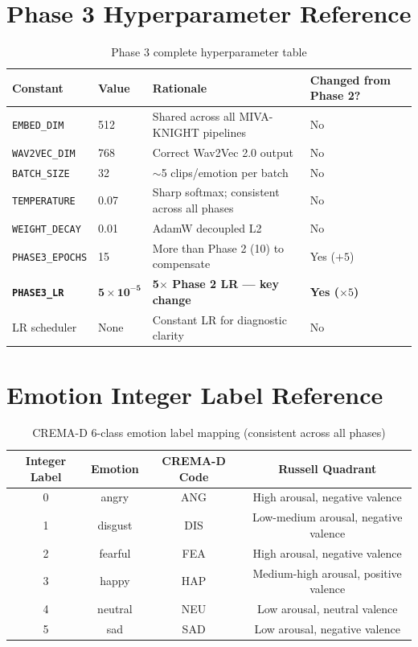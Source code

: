 \documentclass[12pt,a4paper]{article}
\theoremstyle{definition}
\theoremstyle{remark}
\begin{document}
\appendix
\section{Phase 3 Hyperparameter Reference}

\begin{table}[H]
\centering
\caption{Phase 3 complete hyperparameter table}
\begin{tabularx}{\textwidth}{llXl}
\toprule
Constant & Value & Rationale & Changed from Phase 2? \\
\midrule
\texttt{EMBED\_DIM} & 512 & Shared across all MIVA-KNIGHT pipelines & No \\
\texttt{WAV2VEC\_DIM} & 768 & Correct Wav2Vec 2.0 output & No \\
\texttt{BATCH\_SIZE} & 32 & $\sim$5 clips/emotion per batch & No \\
\texttt{TEMPERATURE} & 0.07 & Sharp softmax; consistent across all phases & No \\
\texttt{WEIGHT\_DECAY} & 0.01 & AdamW decoupled L2 & No \\
\texttt{PHASE3\_EPOCHS} & 15 & More than Phase 2 (10) to compensate & Yes ($+5$) \\
\textbf{\texttt{PHASE3\_LR}} & $\mathbf{5\times10^{-5}}$ & \textbf{5$\times$ Phase 2 LR — key change} & \textbf{Yes ($\times 5$)} \\
LR scheduler & None & Constant LR for diagnostic clarity & No \\
\bottomrule
\end{tabularx}
\end{table}

\section{Emotion Integer Label Reference}

\begin{table}[H]
\centering
\caption{CREMA-D 6-class emotion label mapping (consistent across all phases)}
\begin{tabular}{cccc}
\toprule
Integer Label & Emotion & CREMA-D Code & Russell Quadrant \\
\midrule
0 & angry   & ANG & High arousal, negative valence \\
1 & disgust & DIS & Low-medium arousal, negative valence \\
2 & fearful & FEA & High arousal, negative valence \\
3 & happy   & HAP & Medium-high arousal, positive valence \\
4 & neutral & NEU & Low arousal, neutral valence \\
5 & sad     & SAD & Low arousal, negative valence \\
\bottomrule
\end{tabular}
\end{table}
\end{document}
